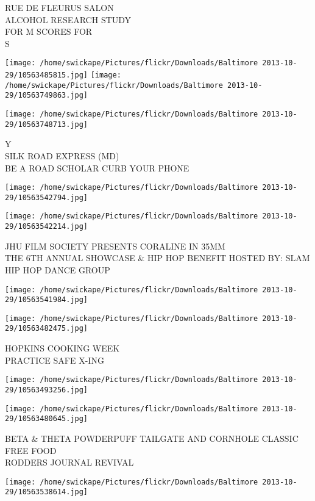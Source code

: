 \documentclass[10pt,letterpaper]{article}
\begin{document}
RUE DE FLEURUS SALON\\
ALCOHOL RESEARCH STUDY\\
FOR M SCORES FOR\\
S
\pagebreak

\texttt{[image: /home/swickape/Pictures/flickr/Downloads/Baltimore 2013-10-29/10563485815.jpg]}
\texttt{[image: /home/swickape/Pictures/flickr/Downloads/Baltimore 2013-10-29/10563749863.jpg]}

\vspace{0.25in}
\texttt{[image: /home/swickape/Pictures/flickr/Downloads/Baltimore 2013-10-29/10563748713.jpg]}

Y\\
SILK ROAD EXPRESS (MD)\\
BE A ROAD SCHOLAR CURB YOUR PHONE
\pagebreak

\texttt{[image: /home/swickape/Pictures/flickr/Downloads/Baltimore 2013-10-29/10563542794.jpg]}

\vspace{0.25in}
\texttt{[image: /home/swickape/Pictures/flickr/Downloads/Baltimore 2013-10-29/10563542214.jpg]}

JHU FILM SOCIETY PRESENTS CORALINE IN 35MM\\
THE 6TH ANNUAL SHOWCASE \& HIP HOP BENEFIT HOSTED BY: SLAM HIP HOP DANCE GROUP
\pagebreak

\texttt{[image: /home/swickape/Pictures/flickr/Downloads/Baltimore 2013-10-29/10563541984.jpg]}

\vspace{0.25in}
\texttt{[image: /home/swickape/Pictures/flickr/Downloads/Baltimore 2013-10-29/10563482475.jpg]}

HOPKINS COOKING WEEK\\
PRACTICE SAFE X{-}ING
\pagebreak

\texttt{[image: /home/swickape/Pictures/flickr/Downloads/Baltimore 2013-10-29/10563493256.jpg]}

\vspace{0.25in}
\texttt{[image: /home/swickape/Pictures/flickr/Downloads/Baltimore 2013-10-29/10563480645.jpg]}

BETA \& THETA POWDERPUFF TAILGATE AND CORNHOLE CLASSIC FREE FOOD\\
RODDERS JOURNAL REVIVAL
\pagebreak

\texttt{[image: /home/swickape/Pictures/flickr/Downloads/Baltimore 2013-10-29/10563538614.jpg]}
\end{document}
